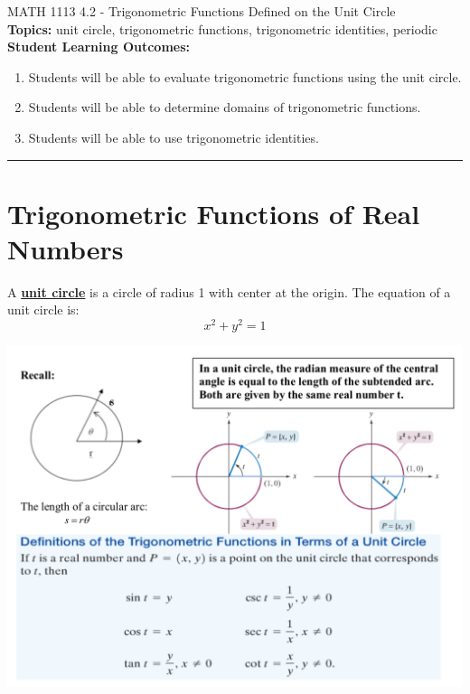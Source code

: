 \documentclass[11pt]{article}
\begin{document}
\noindent MATH 1113   \hfill 4.2 - Trigonometric Functions Defined on the Unit Circle\\



\noindent \textbf{Topics:}  unit circle, trigonometric functions, trigonometric identities, periodic\\

\noindent \textbf{Student Learning Outcomes:}
\begin{enumerate}
\item Students will be able to evaluate trigonometric functions using the unit circle.
\item Students will be able to determine domains of trigonometric functions.
\item Students will be able to use trigonometric identities.
\end{enumerate}

\hrule 
\vspace{5mm}
\section{Trigonometric Functions of Real Numbers}
\noindent A \textbf{\underline{unit circle}} is a circle of radius 1 with center at the origin.  The equation of a unit circle is:
$$x^2+y^2=1$$

\includegraphics[scale=.6]{unitpic}

\newpage
\end{document}
